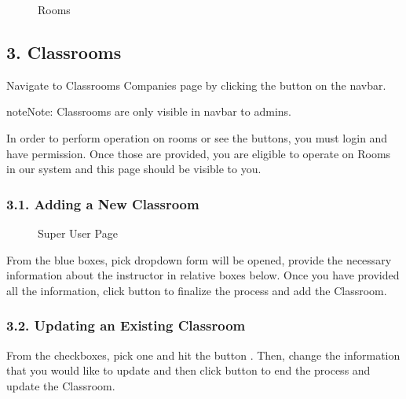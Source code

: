 \documentclass[letterpaper,10pt,english]{sphinxmanual}
\begin{document}
\begin{figure}[htbp]
\centering
\capstart

\noindent{}
\caption{Rooms}\label{\detokenize{user/berkay:id7}}\end{figure}


\subsection{3. Classrooms}
\label{\detokenize{user/berkay:classrooms}}
Navigate to Classrooms Companies page by clicking the  button on the navbar.

\begin{sphinxadmonition}{note}{Note:}
Classrooms are only visible in navbar to admins.
\end{sphinxadmonition}

In order to perform operation on rooms or see the buttons, you must login and have permission.
Once those are provided, you are eligible to operate on Rooms in our system and this page should be
visible to you.


\subsubsection{3.1. Adding a New Classroom}
\label{\detokenize{user/berkay:adding-a-new-classroom}}
\begin{figure}[htbp]
\centering
\capstart

\noindent{}
\caption{Super User Page}\label{\detokenize{user/berkay:id8}}\end{figure}

From the blue boxes, pick  dropdown form will be opened, provide the necessary information
about the instructor in relative boxes below. Once you have provided all the information, click 
button to finalize the process and add the Classroom.


\subsubsection{3.2. Updating an Existing Classroom}
\label{\detokenize{user/berkay:updating-an-existing-classroom}}
From the checkboxes, pick one and hit the button . Then, change the information that
you would like to update and then click  button to end the process and update the Classroom.
\end{document}

